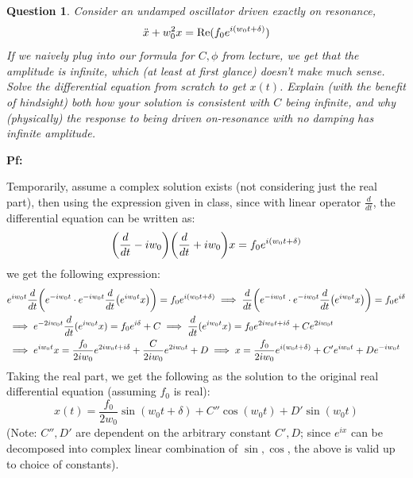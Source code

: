 \documentclass{article}
\newtheorem{question}{Question}
\DeclarePairedDelimiter{\paran}{(}{)}%
\newcommand{\Real}{\textmd{Re}}
\begin{document}
\break

\section{}
\begin{question}\label{q5}
    Consider an \emph{undamped oscillator} driven exactly on resonance,
    $$\ddot x+w_0^2 x=\Real(f_0e^{i(w_0t+\delta)})$$
    If we naively plug into our formula for $C,\phi$ from lecture, we get that the amplitude is infinite, which (at least at first glance) doesn't make much sense. Solve the differential equation from scratch to get $x(t)$. Explain (with the benefit of hindsight) both how your solution is consistent with $C$ being infinite, and why (physically) the response to being driven on-resonance with no damping has infinite amplitude.
\end{question}

\textbf{Pf:}

Temporarily, assume a complex solution exists (not considering just the real part), then using the expression given in class, since with linear operator $\frac{d}{dt}$, the differential equation can be written as:
\begin{equation}
    \paran*{\frac{d}{dt}-iw_0}\paran*{\frac{d}{dt}+iw_0}x = f_0e^{i(w_0t+\delta)}
\end{equation}
 we get the following expression:
\begin{align}
    &e^{iw_0t}\frac{d}{dt}\paran*{e^{-iw_0t}\cdot e^{-iw_0t}\frac{d}{dt}\paran*{e^{iw_0t}x}}=f_0e^{i(w_0t+\delta)}\implies \frac{d}{dt}\paran*{e^{-iw_0t}\cdot e^{-iw_0t}\frac{d}{dt}\paran*{e^{iw_0t}x}} = f_0e^{i\delta}\\
    &\implies e^{-2iw_0t}\frac{d}{dt}(e^{iw_0t}x) = f_0e^{i\delta}+C \implies \frac{d}{dt}(e^{iw_0t}x) = f_0e^{2iw_0t+i\delta}+Ce^{2iw_0t}\\
    &\implies e^{iw_0t}x = \frac{f_0}{2iw_0}e^{2iw_0t+i\delta}+\frac{C}{2iw_0}e^{2iw_0t}+D\implies x = \frac{f_0}{2iw_0}e^{i(w_0t+\delta)}+C'e^{iw_0t}+De^{-iw_0t}
\end{align}
Taking the real part, we get the following as the solution to the original real differential equation (assuming $f_0$ is real):
\begin{equation}
    x(t) = \frac{f_0}{2w_0}\sin(w_0t+\delta) + C''\cos(w_0t)+D'\sin(w_0t)
\end{equation}
(Note: $C'',D'$ are dependent on the arbitrary constant $C',D$; since $e^{ix}$ can be decomposed into complex linear combination of $\sin,\cos$, the above is valid up to choice of constants).
\end{document}
